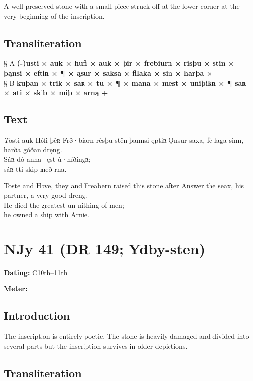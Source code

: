 A well-preserved stone with a small piece struck off at the lower corner at the very beginning of the inscription.

\subsection{Transliteration}

§ A \textbf{(-)usti × auk × hufi × auk × þir × frebiurn × risþu × stin × þąnsi × eftiʀ × ¶ × ąsur × saksa × filaka × sin × harþa ×} \\
§ B \textbf{kuþan × trik × saʀ × tu × ¶ × mana × mest × uniþikʀ × ¶ saʀ × ati × skib × miþ × arną +}

\subsection{Text}

\bpg\bpa[0]%
\startsub \emph{T}osti auk Hófi þêʀ Frø̂·biorn rêsþu stên þannsi ęptiʀ Ǫnsur saxa, fé-laga sinn, harða góðan dręng.\endsub \\
Sáʀ dó anna \hld\ ęst u̇·níðingʀ; \\
\ind sáʀ tti skip með rna.\epa

\bpb Toste and Hove, they and Freabern raised this stone after Answer the seax, his partner, a very good dreng. \\
He died the greatest un-nithing of men; \\
\ind he owned a ship with Arnie.\epb\epg

\sectionline\newpage


\section{NJy 41 (DR 149; Ydby-sten)}

\begin{flushright}%
\textbf{Dating:} C10th--11th

\textbf{Meter:} \Fornyrdislag
\end{flushright}%

\subsection{Introduction}

The inscription is entirely poetic.  The stone is heavily damaged and divided into several parts but the inscription survives in older depictions.

\subsection{Transliteration}

